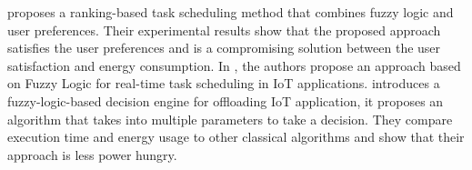 \cite{benblidia-et-al-2019} proposes a ranking-based task scheduling method that combines fuzzy logic and user
preferences. Their experimental results show that the proposed approach satisfies the user preferences and is a
compromising solution between the user satisfaction and energy consumption. In \cite{ali-et-al-2021}, the authors
propose an approach based on Fuzzy Logic for real-time task scheduling in IoT applications. \cite{Hari-et-al-2018}
introduces a fuzzy-logic-based decision engine for offloading IoT application, it proposes an algorithm that takes
into multiple parameters to take a decision. They compare execution time and energy usage to other classical algorithms
and show that their approach is less power hungry.

